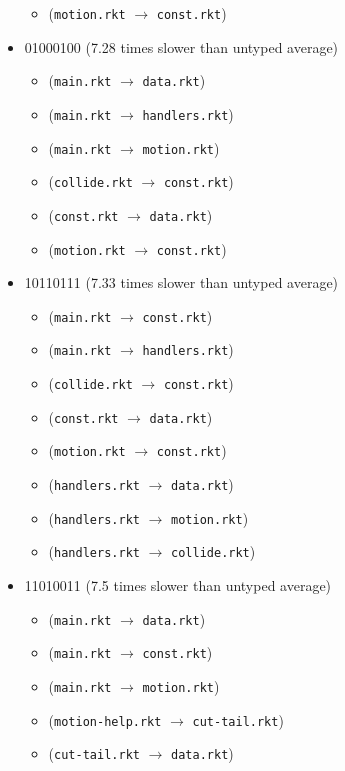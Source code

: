 \documentclass{article}
\newcommand{\mono}[1]{\texttt{#1}}
\begin{document}
\begin{itemize}
\begin{itemize}
  \item (\mono{motion.rkt} $\rightarrow$ \mono{const.rkt})
  \end{itemize}
\item 01000100 (7.28 times slower than untyped average)
  \begin{itemize}
  \item (\mono{main.rkt} $\rightarrow$ \mono{data.rkt})
  \item (\mono{main.rkt} $\rightarrow$ \mono{handlers.rkt})
  \item (\mono{main.rkt} $\rightarrow$ \mono{motion.rkt})
  \item (\mono{collide.rkt} $\rightarrow$ \mono{const.rkt})
  \item (\mono{const.rkt} $\rightarrow$ \mono{data.rkt})
  \item (\mono{motion.rkt} $\rightarrow$ \mono{const.rkt})
  \end{itemize}
\item 10110111 (7.33 times slower than untyped average)
  \begin{itemize}
  \item (\mono{main.rkt} $\rightarrow$ \mono{const.rkt})
  \item (\mono{main.rkt} $\rightarrow$ \mono{handlers.rkt})
  \item (\mono{collide.rkt} $\rightarrow$ \mono{const.rkt})
  \item (\mono{const.rkt} $\rightarrow$ \mono{data.rkt})
  \item (\mono{motion.rkt} $\rightarrow$ \mono{const.rkt})
  \item (\mono{handlers.rkt} $\rightarrow$ \mono{data.rkt})
  \item (\mono{handlers.rkt} $\rightarrow$ \mono{motion.rkt})
  \item (\mono{handlers.rkt} $\rightarrow$ \mono{collide.rkt})
  \end{itemize}
\item 11010011 (7.5 times slower than untyped average)
  \begin{itemize}
  \item (\mono{main.rkt} $\rightarrow$ \mono{data.rkt})
  \item (\mono{main.rkt} $\rightarrow$ \mono{const.rkt})
  \item (\mono{main.rkt} $\rightarrow$ \mono{motion.rkt})
  \item (\mono{motion-help.rkt} $\rightarrow$ \mono{cut-tail.rkt})
  \item (\mono{cut-tail.rkt} $\rightarrow$ \mono{data.rkt})

\end{itemize}
\end{itemize}
\end{document}
